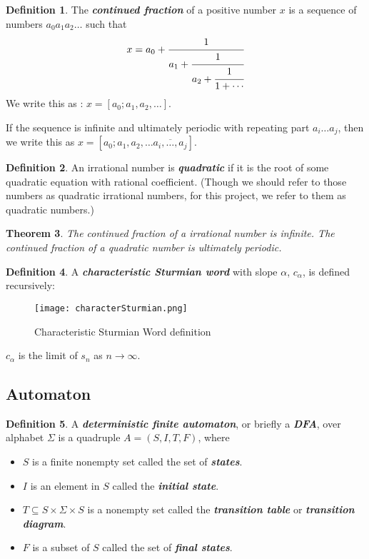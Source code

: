 \documentclass{article}
\theoremstyle{definition}
\newtheorem{definition}{Definition}[section]
\theoremstyle{remark}
\theoremstyle{remark}
\theoremstyle{plain}
\newtheorem{theorem}[definition]{Theorem}
\theoremstyle{definition}
\newcommand{\term}[1]{\emph{\textbf{#1}}}
\begin{document}
\begin{definition}
The \term{continued fraction} of a positive number $x$ is a sequence of numbers $a_0a_1a_2\dots$ such that \[
x=a_0+\cfrac{1}{a_1+\cfrac{1}{a_2+\cfrac{1}{ 1+\cdots}}}
\]
We write this as : $x = [a_0; a_1,a_2,\dots]$.

If the sequence is infinite and ultimately periodic with repeating part $a_i\dots a_j$, then we write this as $x = [a_0;a_1,a_2,\dots \overline{a_i,\dots,a_j}]$.
\end{definition}

\begin{definition}
An irrational number is \term{quadratic} if it is the root of some quadratic equation with rational coefficient. (Though we should refer to those numbers as quadratic irrational numbers, for this project, we refer to them as quadratic numbers.)
\end{definition}

\begin{theorem}
The continued fraction of a irrational number is infinite. The continued fraction of a quadratic number is ultimately periodic. 
\end{theorem}

\begin{definition}
A \term{characteristic Sturmian word} with slope $\alpha$, $c_\alpha$, is defined recursively: 
\begin{figure}[h]
    \centering
    \texttt{[image: characterSturmian.png]}
    \caption{Characteristic Sturmian Word definition}
    \label{fig:characterSturmain}
\end{figure}

$c_\alpha$ is the limit of $s_n$ as $n\to \infty$.
\end{definition}

\newpage
\subsection{Automaton}
\begin{definition}
A \term{deterministic finite automaton}, or briefly a \term{DFA}, over alphabet $\Sigma$ is a quadruple $A = (S, I, T, F)$, where
	\begin{itemize}
		\item $S$ is a finite nonempty set called the set of \term{states}.
		\item $I$ is an element in $S$ called the \term{initial state}.
		\item $T \subseteq S \times \Sigma \times S$ is a nonempty set called the \term{transition table} or \term{transition diagram}.
		\item $F$ is a subset of $S$ called the set of \term{final states}.
	\end{itemize}
\end{definition}
\end{document}
